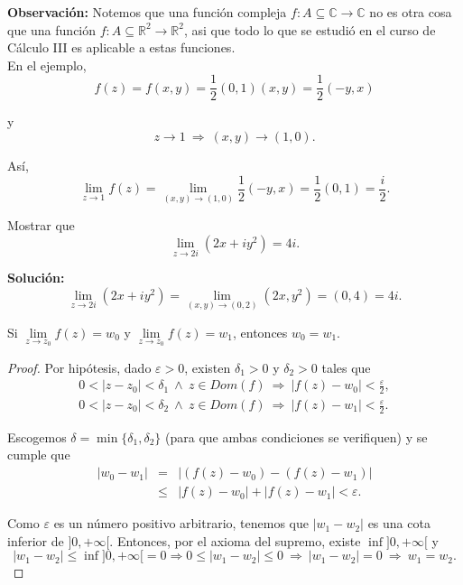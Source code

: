 \textbf{Observación:} Notemos que una función compleja $f: A \subseteq \mathbb{C} \longrightarrow \mathbb{C}$ no es otra cosa que una función $f: A \subseteq \mathbb{R}^2 \longrightarrow \mathbb{R}^2$, asi que todo lo que se estudió en el curso de Cálculo III es aplicable a estas funciones.
\\

En el ejemplo,
$$f(z) = f(x,y) = \frac{1}{2}(0,1)(x,y) = \frac{1}{2}(-y,x)$$

y
$$z \to 1 ~\Rightarrow~ (x,y) \to (1,0).$$

Así,
$$\lim_{z \to 1} f(z) = \lim_{(x,y) \to (1,0)} \frac{1}{2} (-y,x) = \frac{1}{2}(0,1) = \frac{i}{2}.$$

\begin{ejemplo}
Mostrar que
$$\lim_{z \to 2i} (2x+iy^2)= 4i.$$

\textbf{Solución:}
\begin{equation*}
\lim_{z \to 2i} (2x+iy^2) = \lim_{(x,y) \to(0,2)} (2x,y^2) 
= (0,4) = 4i.
\end{equation*}

\end{ejemplo}

\begin{teorema}
Si $\lim\limits_{z \to z_0} f(z) = w_0$ y $\lim\limits_{z \to z_0} f(z) = w_1$, entonces $w_0 = w_1$.
\end{teorema}

\begin{proof}
Por hipótesis, dado $\varepsilon >0$, existen $\delta_1>0$ y $\delta_2 >0$ tales que 
\begin{eqnarray*}
0< |z-z_0| < \delta_1 ~\wedge~ z \in Dom(f) ~\Rightarrow ~ |f(z)-w_0| < \frac{\varepsilon}{2}, \\
0< |z-z_0| < \delta_2 ~\wedge~ z \in Dom(f) ~\Rightarrow ~ |f(z)-w_1| < \frac{\varepsilon}{2}.
\end{eqnarray*}

Escogemos $\delta = \min\{\delta_1, \delta_2\}$ (para que ambas condiciones  se verifiquen) y se cumple que
\begin{eqnarray*}
|w_0-w_1| &=& |(f(z) - w_0) - (f(z) - w_1)| \\
&\leq & |f(z) - w_0| + |f(z) - w_1| < \varepsilon .
\end{eqnarray*}

Como $\varepsilon$ es un número positivo arbitrario, tenemos que $|w_1 - w_2|$ es una cota inferior de $]0, + \infty[$. Entonces, por el axioma del supremo, existe $ \inf]0, + \infty[$ y 
$$|w_1 - w_2| \leq  \inf]0, + \infty[ = 0 \Rightarrow  0 \leq |w_1 - w_2| \leq 0 ~\Rightarrow~ |w_1 - w_2| = 0 ~\Rightarrow~ w_1 = w_2.$$

\end{proof}

